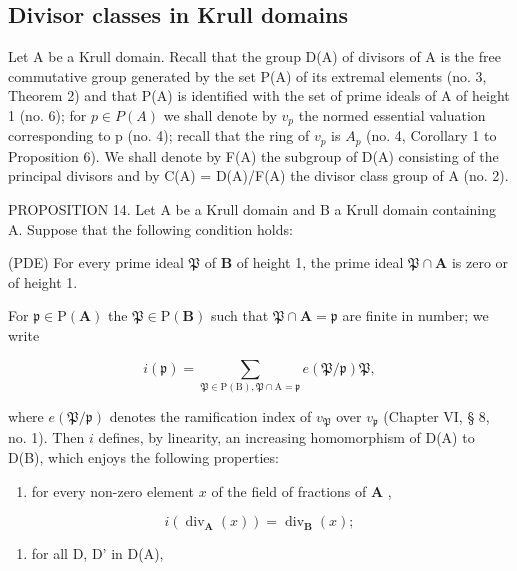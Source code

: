 \subsection{Divisor classes in Krull domains}

Let A be a Krull domain. Recall that the group D(A) of divisors of A is the free commutative group generated by the set P(A) of its extremal elements (no. 3, Theorem 2) and that P(A) is identified with the set of prime ideals of A of height 1 (no. 6); for \(p \in P(A)\) we shall denote by \(v_{p}\) the normed essential valuation corresponding to p (no. 4); recall that the ring of \(v_{p}\) is \(A_{p}\) (no. 4, Corollary 1 to Proposition 6). We shall denote by F(A) the subgroup of D(A) consisting of the principal divisors and by C(A) = D(A)/F(A) the divisor class group of A (no. 2).

PROPOSITION 14. Let A be a Krull domain and B a Krull domain containing A. Suppose that the following condition holds:

(PDE) For every prime ideal \(\mathfrak{P}\) of \(\mathbf{B}\) of height 1, the prime ideal \(\mathfrak{P} \cap \mathbf{A}\) is zero or of height 1.

For \(\mathfrak{p} \in \mathrm{P}(\mathbf{A})\) the \(\mathfrak{P} \in \mathrm{P}(\mathbf{B})\) such that \(\mathfrak{P} \cap \mathbf{A} = \mathfrak{p}\) are finite in number; we write

\[
i (\mathfrak {p}) = \sum_ {\mathfrak {P} \in \mathrm{P} (\mathrm{B}), \mathfrak {P} \cap \mathrm{A} = \mathfrak {p}} e (\mathfrak {P} / \mathfrak {p}) \mathfrak {P},
\]

where \(e(\mathfrak{P} / \mathfrak{p})\) denotes the ramification index of \(v_{\mathfrak{P}}\) over \(v_{\mathfrak{p}}\) (Chapter VI, § 8, no. 1). Then \(i\) defines, by linearity, an increasing homomorphism of D(A) to D(B), which enjoys the following properties:

\begin{enumerate}
\def\labelenumi{(\alph{enumi})}
\tightlist
\item
  for every non-zero element \(x\) of the field of fractions of \(\mathbf{A}\) ,
\end{enumerate}

\[
i \left(\operatorname{div} _ {\mathbf {A}} (x)\right) = \operatorname{div} _ {\mathbf {B}} (x);
\]

\begin{enumerate}
\def\labelenumi{(\alph{enumi})}
\setcounter{enumi}{1}
\tightlist
\item
  for all D, D' in D(A),
\end{enumerate}

